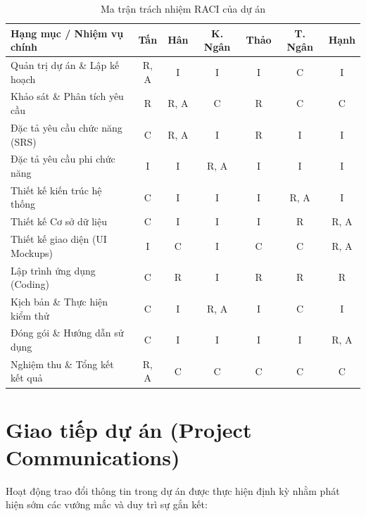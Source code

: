 \begin{table}[H]
\centering
\renewcommand{\arraystretch}{1.3}
\begin{tabularx}{\textwidth}{|>{\raggedright\arraybackslash}X|c|c|c|c|c|c|}
\hline
\rowcolor{tableheader}
\textbf{Hạng mục / Nhiệm vụ chính} & \textbf{Tấn} & \textbf{Hân} & \textbf{K. Ngân} & \textbf{Thảo} & \textbf{T. Ngân} & \textbf{Hạnh} \\ \hline
Quản trị dự án \& Lập kế hoạch & R, A & I & I & I & C & I \\ \hline
Khảo sát \& Phân tích yêu cầu & R & R, A & C & R & C & C \\ \hline
Đặc tả yêu cầu chức năng (SRS) & C & R, A & I & R & I & I \\ \hline
Đặc tả yêu cầu phi chức năng & I & I & R, A & I & I & I \\ \hline
Thiết kế kiến trúc hệ thống & C & I & I & I & R, A & I \\ \hline
Thiết kế Cơ sở dữ liệu & C & I & I & I & R & R, A \\ \hline
Thiết kế giao diện (UI Mockups) & I & C & I & C & C & R, A \\ \hline
Lập trình ứng dụng (Coding) & C & R & I & R & R & R \\ \hline
Kịch bản \& Thực hiện kiểm thử & C & I & R, A & I & C & I \\ \hline
Đóng gói \& Hướng dẫn sử dụng & C & I & I & I & I & R, A \\ \hline
Nghiệm thu \& Tổng kết kết quả & R, A & C & C & C & C & C \\ \hline
\end{tabularx}
\caption{Ma trận trách nhiệm RACI của dự án}
\label{tab:spmp_raci}
\end{table}

\section{Giao tiếp dự án (Project Communications)}
\label{sec:spmp_communications}

Hoạt động trao đổi thông tin trong dự án được thực hiện định kỳ nhằm phát hiện sớm các vướng mắc và duy trì sự gắn kết:

